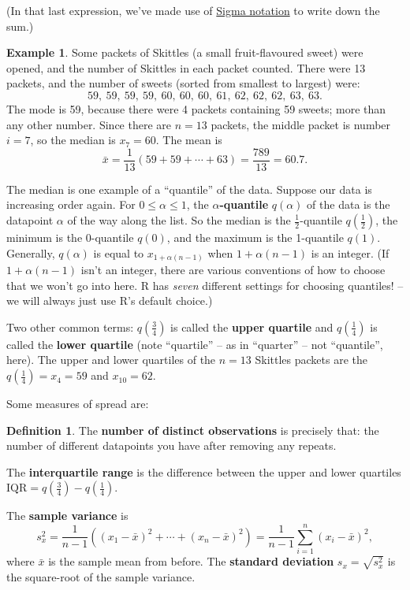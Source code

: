 \documentclass[
  a4paper,
]{book}
\theoremstyle{definition}
\newtheorem{definition}{Definition}[chapter]
\theoremstyle{definition}
\newtheorem{example}{Example}[chapter]
\theoremstyle{definition}
\theoremstyle{definition}
\theoremstyle{remark}
\begin{document}
(In that last expression, we've made use of \href{https://www.mathcentre.ac.uk/resources/workbooks/mathcentre/sigma.pdf}{Sigma notation} to write down the sum.)

\begin{example}
Some packets of Skittles (a small fruit-flavoured sweet) were opened, and the number of Skittles in each packet counted. There were 13 packets, and the number of sweets (sorted from smallest to largest) were:
\[ 59, \ 59, \ 59, \ 59, \ 60, \ 60, \ 60, \ 61, \ 62, \ 62, \ 62, \ 63, \ 63 .\]
The mode is 59, because there were 4 packets containing 59 sweets; more than any other number. Since there are \(n = 13\) packets, the middle packet is number \(i = 7\), so the median is \(x_7 = 60\). The mean is
\[ \bar x = \frac{1}{13} (59 + 59 + \cdots + 63) = \frac{789}{13} = 60.7 .\]
\end{example}

The median is one example of a ``quantile'' of the data. Suppose our data is increasing order again. For \(0 \leq \alpha \leq 1\), the \textbf{\(\alpha\)-quantile} \(q(\alpha)\) of the data is the datapoint \(\alpha\) of the way along the list. So the median is the \(\frac12\)-quantile \(q(\frac12)\), the minimum is the 0-quantile \(q(0)\), and the maximum is the 1-quantile \(q(1)\). Generally, \(q(\alpha)\) is equal to \(x_{1+\alpha(n-1)}\) when \(1+\alpha(n-1)\) is an integer. (If \(1+\alpha(n-1)\) isn't an integer, there are various conventions of how to choose that we won't go into here. R has \emph{seven} different settings for choosing quantiles! -- we will always just use R's default choice.)

Two other common terms: \(q(\frac34)\) is called the \textbf{upper quartile} and \(q(\frac14)\) is called the \textbf{lower quartile} (note ``quartile'' -- as in ``quarter'' -- not ``quantile'', here). The upper and lower quartiles of the \(n = 13\) Skittles packets are the \(q(\frac14) = x_4 = 59\) and \(x_{10} = 62\).

Some measures of spread are:

\begin{definition}
The \textbf{number of distinct observations} is precisely that: the number of different datapoints you have after removing any repeats.

The \textbf{interquartile range} is the difference between the upper and lower quartiles \(\text{IQR} = q(\frac34) - q(\frac14)\).

The \textbf{sample variance} is
\[  s^2_x = \frac{1}{n-1} \left((x_1 - \bar x)^2 + \cdots + (x_n - \bar x)^2 \right) = \frac{1}{n-1} \sum_{i=1}^n (x_i - \bar x)^2 , \]
where \(\bar x\) is the sample mean from before. The \textbf{standard deviation} \(s_x = \sqrt{s^2_x}\) is the square-root of the sample variance.
\end{definition}
\end{document}
